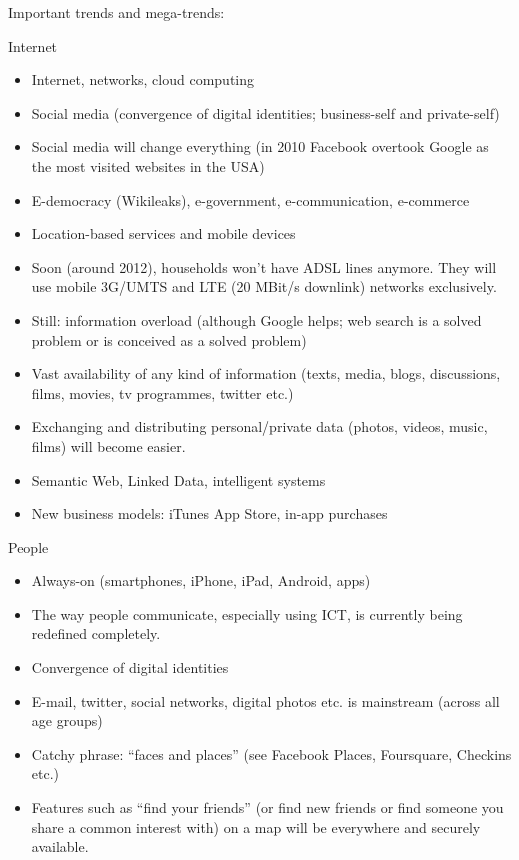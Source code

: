 \documentclass[10pt, plain]{../../metanetpaper}
\begin{document}
\begin{multicols}{2}
Important trends and mega-trends:

Internet

\begin{itemize}
\item Internet, networks, cloud computing
\item Social media (convergence of digital identities; business-self and private-self)
\item Social media will change everything (in 2010 Facebook overtook Google as the most visited websites in the USA)
\item E-democracy (Wikileaks), e-government, e-communication, e-commerce
\item Location-based services and mobile devices
\item Soon (around 2012), households won’t have ADSL lines anymore. They will use mobile 3G/UMTS and LTE (20 MBit/s downlink) networks exclusively.
\item Still: information overload (although Google helps; web search is a solved problem or is conceived as a solved problem)
\item Vast availability of any kind of information (texts, media, blogs, discussions, films, movies, tv programmes, twitter etc.)
\item Exchanging and distributing personal/private data (photos, videos, music, films) will become easier.
\item Semantic Web, Linked Data, intelligent systems
\item New business models: iTunes App Store, in-app purchases
\end{itemize}

People

\begin{itemize}
\item Always-on (smartphones, iPhone, iPad, Android, apps)
\item The way people communicate, especially using ICT, is currently being redefined completely.
\item Convergence of digital identities
\item E-mail, twitter, social networks, digital photos etc. is mainstream (across all age groups)
\item Catchy phrase: “faces and places” (see Facebook Places, Foursquare, Checkins etc.)
\item Features such as “find your friends” (or find new friends or find someone you share a common interest with) on a map will be everywhere and securely available.
\end{itemize}


\end{multicols}
\end{document}
